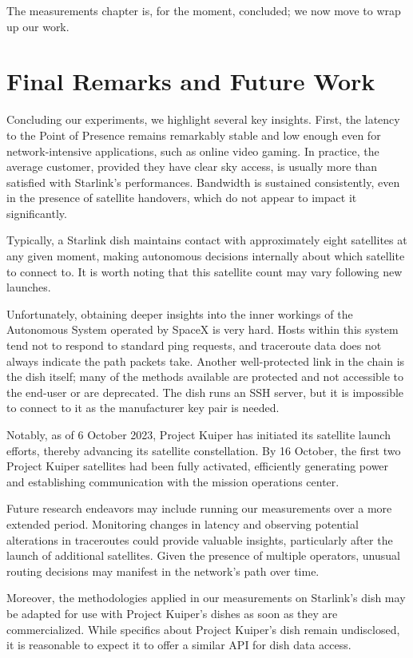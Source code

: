 \documentclass[IN,11pt,twoside,openright,idp,english]{tumthesis}
\begin{document}
The measurements chapter is, for the moment, concluded; we now move to wrap up our work.


\chapter{Final Remarks and Future Work}

Concluding our experiments, we highlight several key insights. First, the latency to the Point of Presence remains
remarkably stable and low enough even for network-intensive applications, such as online video gaming. In practice, the
average customer, provided they have clear sky access, is usually more than satisfied with Starlink's performances.
Bandwidth is sustained consistently, even in the presence of satellite handovers, which do not appear to impact it
significantly.

Typically, a Starlink dish maintains contact with approximately eight satellites at any given moment, making autonomous
decisions internally about which satellite to connect to. It is worth noting that this satellite count may vary
following new launches.

Unfortunately, obtaining deeper insights into the inner workings of the Autonomous System operated by SpaceX is very
hard. Hosts within this system tend not to respond to standard ping requests, and traceroute data does not always
indicate the path packets take. Another well-protected link in the chain is the dish itself; many of the methods
available are protected and not accessible to the end-user or are deprecated. The dish runs an SSH server, but it is
impossible to connect to it as the manufacturer key pair is needed.

Notably, as of 6 October 2023, Project Kuiper has initiated its satellite launch efforts, thereby advancing its
satellite constellation. By 16 October, the first two Project Kuiper satellites had been fully activated, efficiently
generating power and establishing communication with the mission operations center.

Future research endeavors may include running our measurements over a more extended period. Monitoring changes in
latency and observing potential alterations in traceroutes could provide valuable insights, particularly after the
launch of additional satellites. Given the presence of multiple operators, unusual routing decisions may manifest in the
network's path over time.

Moreover, the methodologies applied in our measurements on Starlink's dish may be adapted for use with Project Kuiper's
dishes as soon as they are commercialized. While specifics about Project Kuiper's dish remain undisclosed, it is
reasonable to expect it to offer a similar API for dish data access.
\end{document}
